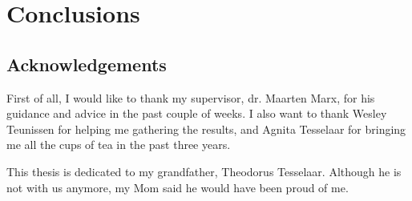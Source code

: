 \section{Conclusions}

\subsection{Acknowledgements}
First of all, I would like to thank my supervisor, dr. Maarten Marx, for his guidance and advice in the past couple of weeks. 
I also want to thank Wesley Teunissen for helping me gathering the results, and Agnita Tesselaar for bringing me all the cups of tea in the past three years.

This thesis is dedicated to my grandfather, Theodorus Tesselaar.
Although he is not with us anymore, my Mom said he would have been proud of me. 